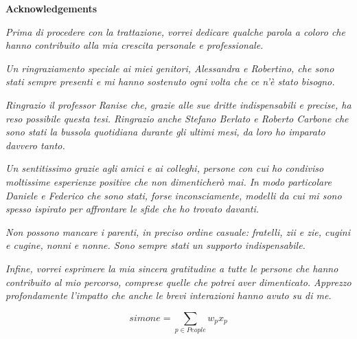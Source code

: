 \thispagestyle{empty}

\begin{center}
    {\bf \Huge Acknowledgements}
\end{center}

\vspace{4cm}


\emph{
    Prima di procedere con la trattazione, vorrei dedicare qualche parola a coloro che hanno contribuito alla mia crescita personale e professionale.
}

\emph{
    Un ringraziamento speciale ai miei genitori, Alessandra e Robertino, che sono stati sempre presenti e mi hanno sostenuto ogni volta che ce n'è stato bisogno.
}

\emph{
    Ringrazio il professor Ranise che, grazie alle sue dritte indispensabili e precise, ha reso possibile questa tesi. Ringrazio anche Stefano Berlato e Roberto Carbone che sono stati la bussola quotidiana durante gli ultimi mesi, da loro ho imparato davvero tanto.
}

\emph{
    Un sentitissimo grazie agli amici e ai colleghi, persone con cui ho condiviso moltissime esperienze positive che non dimenticherò mai. In modo particolare Daniele e Federico che sono stati, forse inconsciamente, modelli da cui mi sono spesso ispirato per affrontare le sfide che ho trovato davanti.
}

\emph{
    Non possono mancare i parenti, in preciso ordine casuale: fratelli, zii e zie, cugini e cugine, nonni e nonne. Sono sempre stati un supporto indispensabile.
}

\emph{
    Infine, vorrei esprimere la mia sincera gratitudine a tutte le persone che hanno contribuito al mio percorso, comprese quelle che potrei aver dimenticato. Apprezzo profondamente l'impatto che anche le brevi interazioni hanno avuto su di me.
}

\[ \mathit{simone} = \sum_{p \in \mathit{People}}{w_p x_p}\]





